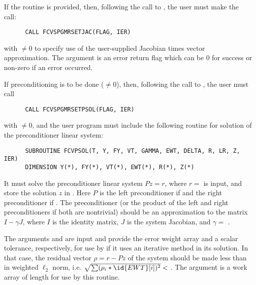 \begin{Steps}
  If the  routine is provided, then, 
  following the call to , the user must make the call:
\begin{verbatim}
      CALL FCVSPGMRSETJAC(FLAG, IER)
\end{verbatim}
  with $\neq 0$ to specify use of the user-supplied Jacobian times
  vector approximation.
  The argument  is an error return flag which can be $0$ 
  for success or non-zero if an error occurred.
  
  If preconditioning is to be done ($\neq 0$), then, following the
  call to , the user must call
\begin{verbatim}
      CALL FCVSPGMRSETPSOL(FLAG, IER)
\end{verbatim}
  with $\neq 0$, and the user program must include the following routine
  for solution of the preconditioner linear system:
\begin{verbatim}
      SUBROUTINE FCVPSOL(T, Y, FY, VT, GAMMA, EWT, DELTA, R, LR, Z, IER)
      DIMENSION Y(*), FY(*), VT(*), EWT(*), R(*), Z(*)
\end{verbatim}
  It must solve the preconditioner linear system $Pz = r$, where $r =$  
  is input, and store the solution $z$ in . Here $P$ is the left 
  preconditioner if  and the right preconditioner if .  
  The preconditioner (or the product of the left and right preconditioners 
  if both are nontrivial) should be an  approximation to the matrix 
  $I - \gamma J$, where $I$ is the identity matrix, $J$ is the system Jacobian,
  and $\gamma =$ .
  
  The arguments  and  are input and provide the error weight
  array and a scalar tolerance, respectively, for use by  if it uses
  an iterative method in its solution.  In that case, the residual vector
  $\rho = r - Pz$ of the system should be made less than  in weighted
  $\ell_2$ norm, i.e. $\sqrt{\sum(\rho_i * \id{EWT}[i])^2} < $ .
  The argument  is a work array of length  for use by this
  routine.


\end{Steps}
